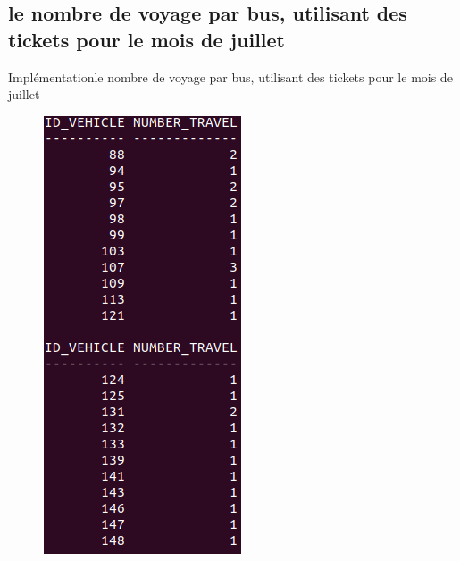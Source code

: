 \documentclass[usenames,dvipsnames]{beamer}
\begin{document}
\subsection{le nombre de voyage par bus, utilisant des tickets pour le mois de juillet}
\begin{frame}{Implémentation}{le nombre de voyage par bus, utilisant des tickets pour le mois de juillet}
\begin{figure}[!ht]
  \centering
  \includegraphics[scale=0.5]{images/requetes_analytiques/requ1.png}
\end{figure}
\end{frame}
\end{document}

